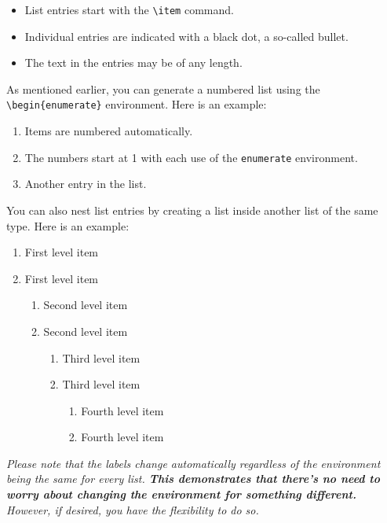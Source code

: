 {\begin{itemize}
  \item List entries start with the \verb|\item| command.
  \item Individual entries are indicated with a black dot, a so-called bullet.
  \item The text in the entries may be of any length.
\end{itemize}

As mentioned earlier, you can generate a numbered list using the \verb|\begin{enumerate}| environment. Here is an example:

\begin{enumerate}
  \item Items are numbered automatically.
  \item The numbers start at 1 with each use of the \verb|enumerate| environment.
  \item Another entry in the list.
\end{enumerate}

You can also nest list entries by creating a list inside another list of the same type. Here is an example:

\begin{enumerate}
    \item First level item
    \item First level item
    \begin{enumerate}
        \item Second level item
        \item Second level item
    \begin{enumerate}
        \item Third level item
        \item Third level item
    \begin{enumerate}
        \item Fourth level item
        \item Fourth level item
    \end{enumerate}
    \end{enumerate}
    \end{enumerate}
\end{enumerate}

\begin{block}[tip]
\textit{Please note that the labels change automatically regardless of the environment being the same for every list. \textbf{This demonstrates that there's no need to worry about changing the environment for something different.} However, if desired, you have the flexibility to do so.}
\end{block}

}
